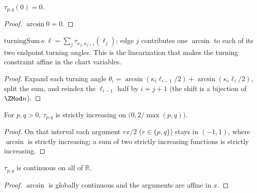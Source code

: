 \begin{lemma}
  \label{lem:chart_map_zero}
  $\tau_{p,q}(0) = 0$.
\end{lemma}
\begin{proof}

\leanok
  $\arcsin 0 = 0$.
\end{proof}

\begin{lemma}
  \label{lem:turning_sum_edge_chart}
  $\mathrm{turningSum}\,\kappa\,\ell = \sum_{j} \tau_{\kappa_j,\kappa_{j+1}}(\ell_j)$:
  edge $j$ contributes one $\arcsin$ to each of its two endpoint turning angles.
  This is the linearization that makes the turning constraint affine in the
  chart variables.
\end{lemma}
\begin{proof}

\leanok
  Expand each turning angle
  $\theta_i = \arcsin(\kappa_i \ell_{i-1}/2) + \arcsin(\kappa_i \ell_i/2)$,
  split the sum, and reindex the $\ell_{i-1}$ half by $i = j+1$ (the shift is a
  bijection of $\ZMod n$).
\end{proof}

\begin{lemma}
  \label{lem:chart_map_strict_mono}
  For $p, q > 0$, $\tau_{p,q}$ is strictly increasing on
  $\bigl(0, 2/\max(p,q)\bigr)$.
\end{lemma}
\begin{proof}

\leanok
  On that interval each argument $rx/2$ ($r \in \{p,q\}$) stays in $(-1,1)$,
  where $\arcsin$ is strictly increasing; a sum of two strictly increasing
  functions is strictly increasing.
\end{proof}

\begin{lemma}
  \label{lem:chart_map_continuous}
  $\tau_{p,q}$ is continuous on all of $\mathbb{R}$.
\end{lemma}
\begin{proof}

\leanok
  $\arcsin$ is globally continuous and the arguments are affine in $x$.
\end{proof}

